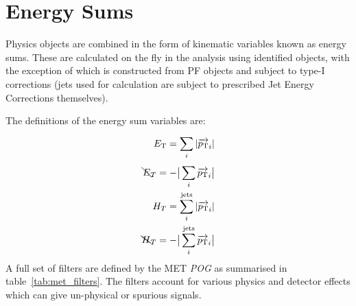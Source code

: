\section{Energy Sums}  %
\label{sec:objects_energy_sums}
Physics objects are combined in the form of kinematic variables known as energy 
sums. These are calculated on the fly in the analysis using identified objects,
with
the exception of \met which is constructed from PF objects and subject to type-I
corrections (jets used for \met calculation are subject to prescribed Jet Energy
Corrections themselves).

The definitions of the energy sum variables are:
% 
\begin{equation}
    \begin{split}
    {E_{\text T}} = \sum_{i}^{} |{\overrightarrow{p_{\text T}}}_i|\\
    \bcancel{E}_T = -\big|\sum_{i}^{} {\overrightarrow{p_{\text T}}}_i\big|\\
    H_T = \sum_{i}^{\textrm{jets}} |{\overrightarrow{p_{\text T}}}_i|\\
    \bcancel{H}_T = -\big|\sum_{i}^{\textrm{jets}} {\overrightarrow{p_{\text T}}}_i\big|\\
    \end{split}
\label{eq:energy_sums}
\end{equation}
% 
A full set of \met filters are defined by the MET \emph{POG} as summarised
in table~\ref{tab:met_filters}. The filters account for various
physics and detector effects which can give un-physical or spurious \met 
signals.

